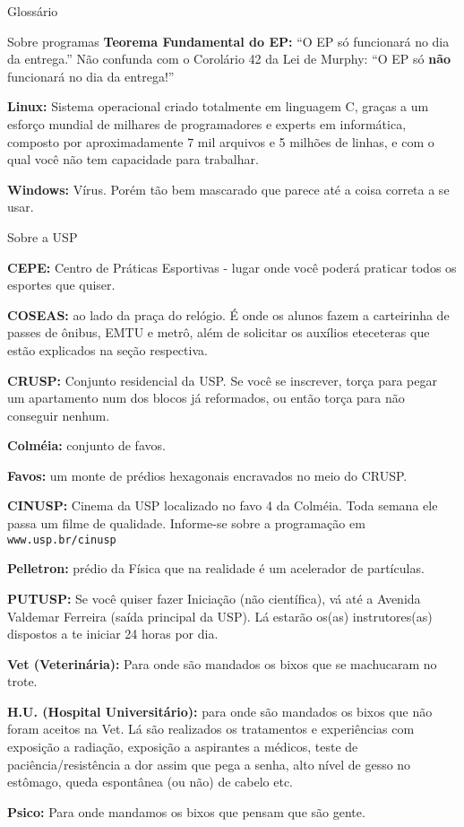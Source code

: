 \begin{secao}{Glossário}
\begin{subsecao}{Sobre programas}
{\bf Teorema Fundamental do EP:} ``O EP só funcionará no dia da entrega.'' Não
confunda com o Corolário 42 da Lei de Murphy: ``O EP só {\bf não} funcionará no
dia da entrega!''

{\bf Linux:} Sistema operacional criado totalmente em linguagem C, graças a um
esforço mundial de milhares de programadores e experts em informática, composto
por aproximadamente 7 mil arquivos e 5 milhões de linhas, e com o qual você não
tem capacidade para trabalhar.

{\bf Windows:} Vírus. Porém tão bem mascarado que parece até a coisa correta a
se usar.
\end{subsecao}

\begin{subsecao}{Sobre a USP}

{\bf CEPE:} Centro de Práticas Esportivas - lugar onde você poderá praticar
todos os esportes que quiser.

{\bf COSEAS:} ao lado da praça do relógio. É onde os alunos fazem a carteirinha
de passes de ônibus, EMTU e metrô, além de solicitar os auxílios eteceteras que
estão explicados na seção respectiva.

{\bf CRUSP:} Conjunto residencial da USP. Se você se inscrever, torça para
pegar um apartamento num dos blocos já reformados, ou então torça para não
conseguir nenhum.

{\bf Colméia:} conjunto de favos.

{\bf Favos:} um monte de prédios hexagonais encravados no meio do CRUSP.

{\bf CINUSP:} Cinema da USP localizado no favo 4 da Colméia. Toda semana ele
passa um filme de qualidade. Informe-se sobre a programação em {\tt www.usp.br/cinusp}

{\bf Pelletron:} prédio da Física que na realidade é um acelerador de
partículas.

{\bf PUTUSP:} Se você quiser fazer Iniciação (não científica), vá até a
Avenida Valdemar Ferreira (saída principal da USP). Lá estarão os(as)
instrutores(as) dispostos a te iniciar 24 horas por dia.

{\bf Vet (Veterinária):} Para onde são mandados os bixos que se machucaram no
trote.

{\bf H.U. (Hospital Universitário):} para onde são mandados os bixos que não
foram aceitos na Vet. Lá são realizados os tratamentos e experiências com
exposição a radiação, exposição a aspirantes a médicos, teste de
paciência/resistência a dor assim que pega a senha, alto nível de gesso no
estômago, queda espontânea (ou não) de cabelo etc.

{\bf Psico:} Para onde mandamos os bixos que pensam que são gente.

\end{subsecao}
\end{secao}
